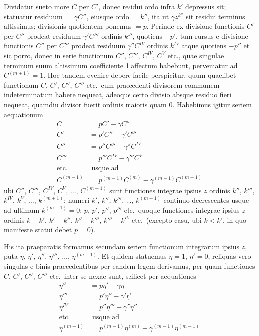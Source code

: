 \documentclass[12pt,a4paper]{article}
\begin{document}
Dividatur sueto more $C$ per $C'$, donec residui ordo infra $k'$ depressus sit; statuatur residuum $=\gamma C''$, eiusque ordo $=k''$, ita ut $\gamma z^{k''}$ sit residui terminus altissimus; divisionis quotientem ponemus $=p$. Perinde ex divisione functionis $C'$ per $C''$ prodeat residuum $\gamma'C'''$ ordinis $k'''$, quotiens $-p'$, tum rursus e divisione functionis $C''$ per $C'''$ prodeat residuum $\gamma''C^{IV}$ ordinis $k^{IV}$ atque quotiens $-p''$ et sic porro, donec in serie functionum $C''$, $C'''$, $C^{IV}$, $C^{V}$ etc., quae singulae terminum suum altissimum coefficiente 1 affectum habebunt, perveniatur ad $C^{(m+1)}=1$. Hoc tandem evenire debere facile perspicitur, quum quaelibet functionum $C$, $C'$, $C''$, $C'''$ etc.\ cum praecedenti divisorem communem indeterminatum habere nequeat, adeoque certo divisio absque residuo fieri nequeat, quamdiu divisor fuerit ordinis maioris quam $0$. Habebimus igitur seriem aequationum
\begin{align*}
C &= pC' - \gamma C''\\
C' &= p'C'' - \gamma' C'''\\
C'' &= p''C''' - \gamma'' C^{IV}\\
C''' &= p'''C^{IV} - \gamma''' C^{V}\\
\text{etc.}&\text{ usque ad}\\
C^{(m-1)} &= p^{(m-1)}C^{(m)} - \gamma^{(m-1)}C^{(m+1)}
\end{align*}
ubi $C''$, $C'''$, $C^{IV}$, $C^{V}$, $\ldots$, $C^{(m+1)}$ sunt functiones integrae ipsius $z$ ordinis $k''$, $k'''$, $k^{IV}$, $k^{V}$, $\ldots$, $k^{(m+1)}$; numeri $k'$, $k''$, $k'''$, $\ldots$, $k^{(m+1)}$ continuo decrescentes usque ad ultimum $k^{(m+1)}=0$; $p$, $p'$, $p''$, $p'''$ etc.\ quoque functiones integrae ipsius $z$ ordinis $k-k'$, $k'-k''$, $k''-k'''$, $k'''-k^{IV}$ etc.\ (excepto casu, ubi $k<k'$, in quo manifeste statui debet $p=0$).

His ita praeparatis formamus secundam seriem functionum integrarum ipsius $z$, puta $\eta$, $\eta'$, $\eta''$, $\eta'''$, $\ldots$, $\eta^{(m+1)}$. Et quidem statuemus $\eta=1$, $\eta'=0$, reliquas vero singulas e binis praecedentibus per eandem legem derivamus, per quam functiones $C$, $C'$, $C''$, $C'''$ etc.\ inter se nexae sunt, scilicet per aequationes
\begin{align*}
\eta'' &= p\eta' - \gamma\eta\\
\eta''' &= p'\eta'' - \gamma'\eta'\\
\eta^{IV} &= p''\eta''' - \gamma''\eta''\\
\text{etc.}&\text{ usque ad}\\
\eta^{(m+1)} &= p^{(m-1)}\eta^{(m)} - \gamma^{(m-1)}\eta^{(m-1)}
\end{align*}
\end{document}
